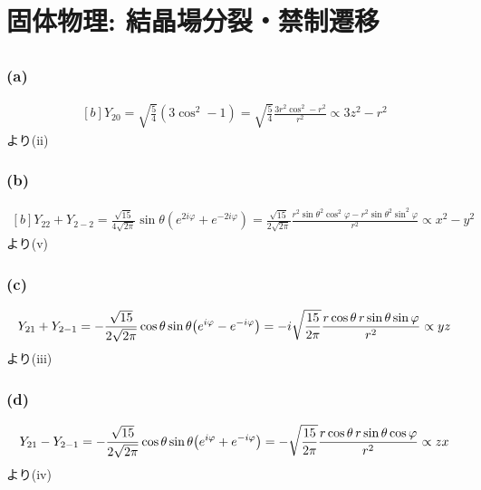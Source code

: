\documentclass[../ap_2011.tex]{subfiles}
\begin{document}
\setcounter{chapter}{3}
\chapter{固体物理: 結晶場分裂・禁制遷移}
\section{}
\subsection*{(a)}
\begin{equation}\begin{aligned}[b]
    Y_{20} = \sqrt{\frac{5}{4}}(3\cos^2-1)
    =\sqrt{\frac{5}{4}}\frac{3r^2\cos^2-r^2}{r^2}\propto 3z^2-r^2
\end{aligned}\end{equation}
より(ii)

\subsection*{(b)}
\begin{equation}\begin{aligned}[b]
    Y_{22}+Y_{2-2} = \frac{\sqrt{15}}{4\sqrt{2\pi}}\sin\theta(e^{2i\varphi}+e^{-2i\varphi})
    =\frac{\sqrt{15}}{2\sqrt{2\pi}}\frac{r^2\sin\theta^2\cos^2\varphi-r^2\sin\theta^2\sin^2\varphi}{r^2}\propto x^2-y^2
\end{aligned}\end{equation}
より(v)

\subsection*{(c)}
\begin{equation}\begin{aligned}[b]
    Y_{21}+Y_{2-1}=-\frac{\sqrt{15}}{2\sqrt{2\pi}}\cos\theta\sin\theta\qty(e^{i\varphi}-e^{-i\varphi})
    =-i\sqrt{\frac{15}{2\pi}}\frac{r\cos\theta \,r\sin\theta\sin\varphi}{r^2} \propto yz
\end{aligned}\end{equation}
より(iii)

\subsection*{(d)}
\begin{equation}\begin{aligned}[b]
    Y_{21}-Y_{2-1}=-\frac{\sqrt{15}}{2\sqrt{2\pi}}\cos\theta\sin\theta\qty(e^{i\varphi}+e^{-i\varphi})
    =-\sqrt{\frac{15}{2\pi}}\frac{r\cos\theta \,r\sin\theta\cos\varphi}{r^2} \propto zx
\end{aligned}\end{equation}
より(iv)
\end{document}
